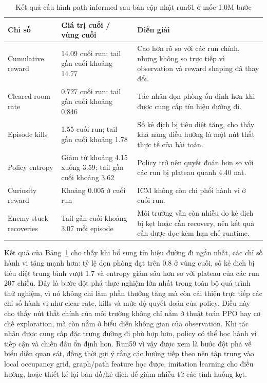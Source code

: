 \begin{table}[H]
    \centering
    \small
    \caption{Kết quả cấu hình path-informed sau bản cập nhật run61 ở mốc 1.0M bước}
    \label{tab:run59_bfs_assisted}
    \begin{tabular}{|p{4.1cm}|p{3.2cm}|p{6.4cm}|}
        \hline
        \textbf{Chỉ số} & \textbf{Giá trị cuối / vùng cuối} & \textbf{Diễn giải} \\
        \hline
        Cumulative reward & 14.09 cuối run; tail gần cuối khoảng 14.77 & Cao hơn rõ so với các run chính, nhưng không so trực tiếp vì observation và reward shaping đã thay đổi. \\
        \hline
        Cleared-room rate & 0.727 cuối run; tail gần cuối khoảng 0.846 & Tác nhân dọn phòng ổn định hơn khi được cung cấp tín hiệu đường đi. \\
        \hline
        Episode kills & 1.55 cuối run; tail gần cuối khoảng 1.78 & Số kẻ địch bị tiêu diệt tăng, cho thấy khả năng điều hướng là một nút thắt thực tế của bài toán. \\
        \hline
        Policy entropy & Giảm từ khoảng 4.15 xuống 3.59; tail gần cuối khoảng 3.62 & Policy trở nên quyết đoán hơn so với các run bị plateau quanh 4.40 nat. \\
        \hline
        Curiosity reward & Khoảng 0.005 ở cuối run & ICM không còn chi phối hành vi ở cuối run. \\
        \hline
        Enemy stuck recoveries & Tail gần cuối khoảng 3.07 mỗi episode & Môi trường vẫn còn nhiễu do kẻ địch bị kẹt hoặc cần recovery, nên kết quả cần được đọc kèm hạn chế runtime. \\
        \hline
    \end{tabular}
\end{table}

Kết quả của Bảng~\ref{tab:run59_bfs_assisted} cho thấy khi bổ sung tín hiệu đường đi ngắn nhất, các chỉ số hành vi tăng mạnh hơn: tỷ lệ dọn phòng đạt trên 0.8 ở vùng cuối, số kẻ địch bị tiêu diệt trung bình vượt 1.7 và entropy giảm sâu hơn so với plateau của các run 207 chiều. Đây là bước đột phá thực nghiệm lớn nhất trong toàn bộ quá trình thử nghiệm, vì nó không chỉ làm phần thưởng tăng mà còn cải thiện trực tiếp các chỉ số hành vi như clear rate, kills và mức độ quyết đoán của policy. Điều này cho thấy nút thắt chính của môi trường không chỉ nằm ở thuật toán PPO hay cơ chế exploration, mà còn nằm ở biểu diễn không gian của observation. Khi tác nhân được cung cấp đặc trưng đường đi phù hợp hơn, policy có thể học hành vi tiếp cận và chiến đấu ổn định hơn. Run59 vì vậy được xem là bước đột phá về biểu diễn quan sát, đồng thời gợi ý rằng các hướng tiếp theo nên tập trung vào local occupancy grid, graph/path feature học được, imitation learning cho điều hướng, hoặc thiết kế lại bản đồ/kẻ địch để giảm nhiễu từ các tình huống kẹt.

